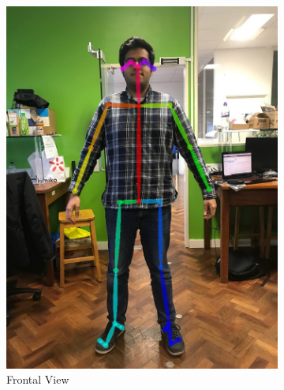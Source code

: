 \begin{figure}[ht]
	\begin{subfigure}[b]{.32\textwidth}
		\centering
		\includegraphics[width=1.0\linewidth]{img/chapter5_implementation/shreyFront.png}
		\caption{Frontal View}
	\end{subfigure}%
	\hspace{\fill} 
	\begin{subfigure}[b]{.32\textwidth}
		\centering

\end{subfigure}
\end{figure}
